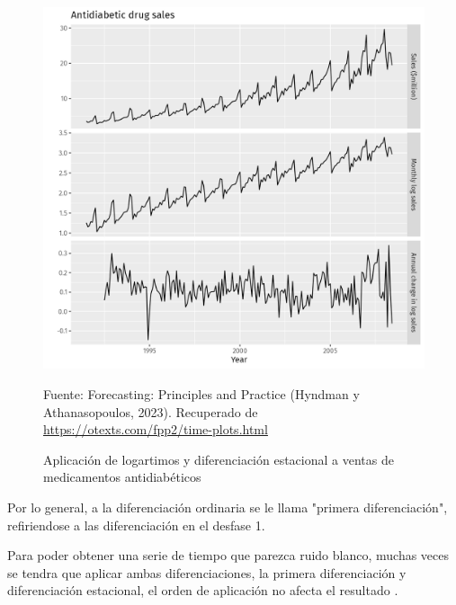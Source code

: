 \begin{itemize}
    \begin{figure}[H]
        \begin{minipage}[t]{0.9\textwidth}
            \caption{Aplicación de logartimos y diferenciación estacional a ventas de medicamentos antidiabéticos}
            \label{seasonaldiff}        
        \end{minipage}
    
        \vspace{10pt}
    
        \begin{minipage}[b]{0.9\textwidth}
            \centering
            \includegraphics[width=\textwidth]{img/a10diff-1-seasonaldiff-example.png}        
        \end{minipage}
    
        \begin{minipage}[t]{0.9\textwidth}
            Fuente: Forecasting: Principles and Practice (Hyndman y Athanasopoulos, 2023). Recuperado de \url{https://otexts.com/fpp2/time-plots.html}
        \end{minipage}
    \end{figure}

    Por lo general, a la diferenciación ordinaria se le llama "primera diferenciación", refiriendose a las diferenciación en el desfase 1. 
    
    Para poder obtener una serie de tiempo que parezca ruido blanco, muchas veces se tendra que aplicar ambas diferenciaciones, la primera diferenciación y diferenciación estacional, el orden de aplicación no afecta el resultado \cite{forecast-time-series-arima}.
    

\end{itemize}

